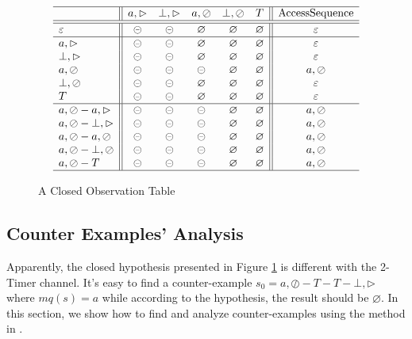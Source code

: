 \documentclass[conference, a4paper]{IEEEtran}
\newcommand{\rblock}[0]{\circleddash}
\newcommand{\rread}[0]{\rhd}
\newcommand{\rnoread}[0]{\oslash}
\newcommand{\rempty}[0]{\varnothing}
\begin{document}
\begin{figure}[ht]
  \begin{center}
    \begin{small}
      \begin{displaymath}
        \begin{array}{l||ccccc||c}
          \hline
          & a,\rread & \bot,\rread & a,\rnoread & \bot,\rnoread & T & \mbox{AccessSequence}\\
          \hline\hline
          \varepsilon & \rblock & \rblock & \rempty & \rempty & \rempty & \varepsilon \\
          \hline
          a,\rread & \rblock & \rblock & \rempty & \rempty & \rempty & \varepsilon\\
          \bot,\rread & \rblock & \rblock & \rempty & \rempty & \rempty & \varepsilon \\
          a,\rnoread & \rblock & \rblock & \rblock & \rempty & \rempty & a,\rnoread \\
          \bot,\rnoread & \rblock & \rblock & \rempty & \rempty & \rempty & \varepsilon \\
          T & \rblock & \rblock & \rempty & \rempty & \rempty & \varepsilon \\
          \hline
          a,\rnoread-a,\rread & \rblock & \rblock & \rblock & \rempty & \rempty & a,\rnoread \\
          a,\rnoread-\bot,\rread & \rblock & \rblock & \rblock & \rempty & \rempty & a,\rnoread \\
          a,\rnoread-a,\rnoread & \rblock & \rblock & \rblock & \rempty & \rempty & a,\rnoread \\
          a,\rnoread-\bot,\rnoread & \rblock & \rblock & \rblock & \rempty & \rempty & a,\rnoread \\
          a,\rnoread-T & \rblock & \rblock & \rblock & \rempty & \rempty & a,\rnoread \\
          \hline
        \end{array}
      \end{displaymath}
    \end{small}
  \end{center}
  \caption{A Closed Observation Table}
  \label{fig:hypo2}
\end{figure}

\subsection{Counter Examples' Analysis} 
Apparently, the closed hypothesis presented in Figure \ref{fig:hypo2} is different with the 2-Timer
channel. It's easy to find a counter-example $s_0=a,\rnoread-T-T-\bot,\rread$ where $mq(s)=a$ while
according to the hypothesis, the result should be $\rempty$. In this section, we show how to
find and analyze counter-examples using the method in \cite{DBLP:conf/sfm/SteffenHM11}. 
\end{document}
